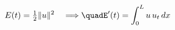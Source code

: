 \documentclass[preview]{standalone}
\begin{document}
\begin{align*}
E(t)=\tfrac{1}{2}\|u\|^2\quad\Longrightarrow\quadE'(t)=\int_0^L u\,u_t\,dx
\end{align*}
\end{document}
